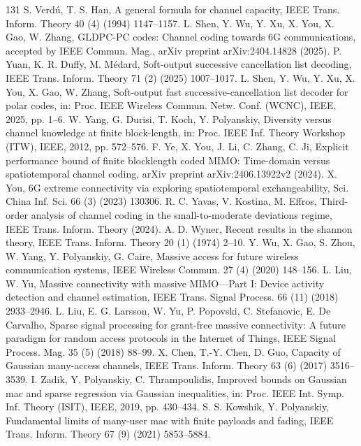 \begin{thebibliography}{131}
 S. Verdú, T. S. Han, A general formula for channel capacity, IEEE Trans. Inform. Theory 40 (4) (1994) 1147--1157.
 L. Shen, Y. Wu, Y. Xu, X. You, X. Gao, W. Zhang, GLDPC-PC codes: Channel coding towards 6G communications, accepted by IEEE Commun. Mag., arXiv preprint arXiv:2404.14828 (2025).
 P. Yuan, K. R. Duffy, M. Médard, Soft-output successive cancellation list decoding, IEEE Trans. Inform. Theory 71 (2) (2025) 1007--1017.
 L. Shen, Y. Wu, Y. Xu, X. You, X. Gao, W. Zhang, Soft-output fast successive-cancellation list decoder for polar codes, in: Proc. IEEE Wireless Commun. Netw. Conf. (WCNC), IEEE, 2025, pp. 1--6.
 W. Yang, G. Durisi, T. Koch, Y. Polyanskiy, Diversity versus channel knowledge at finite block-length, in: Proc. IEEE Inf. Theory Workshop (ITW), IEEE, 2012, pp. 572--576.
 F. Ye, X. You, J. Li, C. Zhang, C. Ji, Explicit performance bound of finite blocklength coded MIMO: Time-domain versus spatiotemporal channel coding, arXiv preprint arXiv:2406.13922v2 (2024).
 X. You, 6G extreme connectivity via exploring spatiotemporal exchangeability, Sci. China Inf. Sci. 66 (3) (2023) 130306.
 R. C. Yavas, V. Kostina, M. Effros, Third-order analysis of channel coding in the small-to-moderate deviations regime, IEEE Trans. Inform. Theory (2024).
 A. D. Wyner, Recent results in the shannon theory, IEEE Trans. Inform. Theory 20 (1) (1974) 2--10.
 Y. Wu, X. Gao, S. Zhou, W. Yang, Y. Polyanskiy, G. Caire, Massive access for future wireless communication systems, IEEE Wireless Commun. 27 (4) (2020) 148--156.
 L. Liu, W. Yu, Massive connectivity with massive MIMO---Part I: Device activity detection and channel estimation, IEEE Trans. Signal Process. 66 (11) (2018) 2933--2946.
 L. Liu, E. G. Larsson, W. Yu, P. Popovski, C. Stefanovic, E. De Carvalho, Sparse signal processing for grant-free massive connectivity: A future paradigm for random access protocols in the Internet of Things, IEEE Signal Process. Mag. 35 (5) (2018) 88--99.
 X. Chen, T.-Y. Chen, D. Guo, Capacity of Gaussian many-access channels, IEEE Trans. Inform. Theory 63 (6) (2017) 3516--3539.
 I. Zadik, Y. Polyanskiy, C. Thrampoulidis, Improved bounds on Gaussian mac and sparse regression via Gaussian inequalities, in: Proc. IEEE Int. Symp. Inf. Theory (ISIT), IEEE, 2019, pp. 430--434.
 S. S. Kowshik, Y. Polyanskiy, Fundamental limits of many-user mac with finite payloads and fading, IEEE Trans. Inform. Theory 67 (9) (2021) 5853--5884.

\end{thebibliography}
